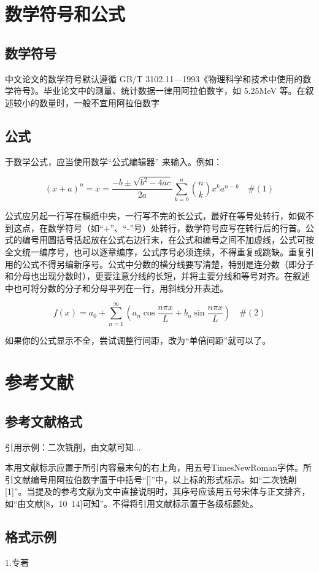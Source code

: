 \documentclass[12pt,a4paper]{ctexart}
\begin{document}
\section{数学符号和公式}
\subsection{数学符号}
中文论文的数学符号默认遵循 GB/T 3102.11—1993《物理科学和技术中使用的数学符号》。毕业论文中的测量、统计数据一律用阿拉伯数字，如 5.25MeV 等。在叙述较小的数量时，一般不宜用阿拉伯数字
\subsection{公式}
于数学公式，应当使用数学“公式编辑器” 来输入。例如：

\[
(x+a)^n = x = \frac{-b \pm \sqrt{b^2 - 4ac}}{2a} \sum_{k=0}^n \binom{n}{k} x^k a^{n - k} \quad \#(1)
\]

公式应另起一行写在稿纸中央，一行写不完的长公式，最好在等号处转行，如做不到这点，在数学符号（如“+”、“-”号）处转行，数学符号应写在转行后的行首。公式的编号用圆括号括起放在公式右边行末，在公式和编号之间不加虚线，公式可按全文统一编序号，也可以逐章编序，公式序号必须连续，不得重复或跳缺。重复引用的公式不得另编新序号。公式中分数的横分线要写清楚，特别是连分数（即分子和分母也出现分数时），更要注意分线的长短，并将主要分线和等号对齐。在叙述中也可将分数的分子和分母平列在一行，用斜线分开表述。

\[
f(x) = a_0 + \sum_{n=1}^{\infty} \left( a_n \cos \frac{n \pi x}{L} + b_n \sin \frac{n \pi x}{L} \right) \quad \#(2)
\]

如果你的公式显示不全，尝试调整行间距，改为“单倍间距”就可以了。

\newpage
\section{参考文献}
\subsection{参考文献格式}
引用示例：二次铣削\cite{ref1}，由文献\cite{ref2,ref3}可知...

本用文献标示应置于所引内容最末句的右上角，用五号TimesNewRoman字体。所引文献编号用阿拉伯数字置于中括号“[]”中，以上标的形式标示。如“二次铣削[1]”。当提及的参考文献为文中直接说明时，其序号应该用五号宋体与正文排齐，如“由文献[8，10~14]可知”。不得将引用文献标示置于各级标题处。
\subsection{格式示例}
1.专著
\end{document}
